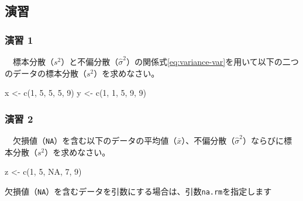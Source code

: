 \documentclass[
  12pt,
]{book}
\newenvironment{Shaded}{\begin{snugshade}}{\end{snugshade}}
\newcommand{\ConstantTok}[1]{\textcolor[rgb]{0.00,0.00,0.00}{#1}}
\newcommand{\DecValTok}[1]{\textcolor[rgb]{0.00,0.00,0.81}{#1}}
\newcommand{\FunctionTok}[1]{\textcolor[rgb]{0.00,0.00,0.00}{#1}}
\newcommand{\NormalTok}[1]{#1}
\newcommand{\OtherTok}[1]{\textcolor[rgb]{0.56,0.35,0.01}{#1}}
\begin{document}
\hypertarget{ux6f14ux7fd2}{%
\subsection{演習}\label{ux6f14ux7fd2}}

\hypertarget{ux6f14ux7fd2-1}{%
\subsubsection*{演習 1}\label{ux6f14ux7fd2-1}}

　標本分散（\(s^2\)）と不偏分散（\(\hat{\sigma}^2\)）の関係式\eqref{eq:variance-var}を用いて以下の二つのデータの標本分散（\(s^2\)）を求めなさい。

\begin{Shaded}
\begin{Highlighting}[numbers=left,,]
\NormalTok{x }\OtherTok{\textless{}{-}} \FunctionTok{c}\NormalTok{(}\DecValTok{1}\NormalTok{, }\DecValTok{5}\NormalTok{, }\DecValTok{5}\NormalTok{, }\DecValTok{5}\NormalTok{, }\DecValTok{9}\NormalTok{)}
\NormalTok{y }\OtherTok{\textless{}{-}} \FunctionTok{c}\NormalTok{(}\DecValTok{1}\NormalTok{, }\DecValTok{1}\NormalTok{, }\DecValTok{5}\NormalTok{, }\DecValTok{9}\NormalTok{, }\DecValTok{9}\NormalTok{)}
\end{Highlighting}
\end{Shaded}

\hypertarget{ux6f14ux7fd2-2}{%
\subsubsection*{演習 2}\label{ux6f14ux7fd2-2}}

　欠損値（\texttt{NA}）を含む以下のデータの平均値（\(\bar{x}\)）、不偏分散（\(\hat{\sigma}^2\)）ならびに標本分散（\(s^2\)）を求めなさい。

\begin{Shaded}
\begin{Highlighting}[numbers=left,,]
\NormalTok{z }\OtherTok{\textless{}{-}} \FunctionTok{c}\NormalTok{(}\DecValTok{1}\NormalTok{, }\DecValTok{5}\NormalTok{, }\ConstantTok{NA}\NormalTok{, }\DecValTok{7}\NormalTok{, }\DecValTok{9}\NormalTok{)}
\end{Highlighting}
\end{Shaded}

\begin{hint-box}
欠損値（\texttt{NA}）を含むデータを引数にする場合は、引数\texttt{na.rm}を指定します

\end{hint-box}
\end{document}
